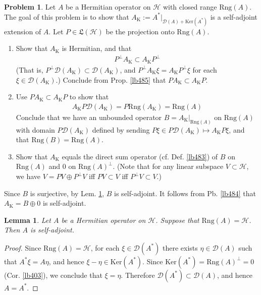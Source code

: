 \documentclass[12pt,b5paper,notitlepage]{article}
\theoremstyle{definition}
\newtheorem{prob}{\color{red}Problem}[section]
\theoremstyle{plain}
\newtheorem{lm}[df]{Lemma}
\newcommand{\fk}{\mathfrak}
\newcommand{\Dom}{\mathscr{D}}
\newcommand{\Ker}{\mathrm{Ker}}
\newcommand{\Rng}{\mathrm{Rng}}
\newcommand{\MH}{\mathcal H}
\newcommand{\Krm}{{\mathrm K}}
\numberwithin{equation}{section}
\begin{document}
\begin{prob}
Let $A$ be a Hermitian operator on $\MH$ with closed range $\Rng(A)$. The goal of this problem is to show that $A_\Krm:=A^*|_{\Dom(A)+\Ker(A^*)}$ is a self-adjoint extension of $A$. Let $P\in\fk L(\MH)$ be the projection onto $\Rng(A)$.
\begin{enumerate}
\item  Show that $A_\Krm$ is Hermitian, and that
\begin{align*}
P^\perp A_\Krm\subset A_\Krm P^\perp
\end{align*}
(That is, $P^\perp\Dom(A_\Krm)\subset\Dom(A_\Krm)$, and $P^\perp A_\Krm\xi=A_\Krm P^\perp\xi$ for each $\xi\in\Dom(A_\Krm)$.) Conclude from Prop. \ref{lb485} that $PA_\Krm\subset A_\Krm P$.
\item Use $PA_\Krm\subset A_\Krm P$ to show that
\begin{align*}
A_\Krm P\Dom(A_\Krm)=P\Rng(A_\Krm)=\Rng(A)
\end{align*}
Conclude that we have an unbounded operator $B=A_\Krm|_{\Rng(A)}$ on $\Rng(A)$ with domain $P\Dom(A_\Krm)$ defined by sending $P\xi\in P\Dom(A_\Krm)\mapsto A_\Krm P\xi$, and that $\Rng(B)=\Rng(A)$. 
\item Show that $A_\Krm$ equals the direct sum operator (cf. Def. \ref{lb483}) of $B$ on $\Rng(A)$ and $0$ on $\Rng(A)^\perp$. (Note that for any linear subspace $V\subset \MH$, we have $V=PV\oplus P^\perp V$ iff $PV\subset V$ iff $P^\perp V\subset V$.) 
\end{enumerate}
Since $B$ is surjective, by Lem. \ref{lb486}, $B$ is self-adjoint. It follows from Pb. \ref{lb484} that $A_\Krm=B\oplus 0$ is self-adjoint.
\end{prob}


\begin{lm}\label{lb486}
Let $A$ be a Hermitian operator on $\MH$. Suppose that $\Rng(A)=\MH$. Then $A$ is self-adjoint.
\end{lm}


\begin{proof}
Since $\Rng(A)=\MH$, for each $\xi\in\Dom(A^*)$ there exists $\eta\in\Dom(A)$ such that $A^*\xi=A\eta$, and hence $\xi-\eta\in\Ker(A^*)$. Since $\Ker(A^*)=\Rng(A)^\perp=0$ (Cor. \ref{lb403}), we conclude that $\xi=\eta$. Therefore $\Dom(A^*)\subset\Dom(A)$, and hence $A=A^*$.
\end{proof}






\newpage
\end{document}

